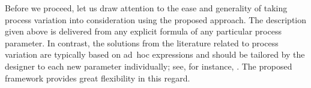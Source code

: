 Before we proceed, let us draw attention to the ease and generality of taking
process variation into consideration using the proposed approach. The
description given above is delivered from any explicit formula of any particular
process parameter. In contrast, the solutions from the literature related to
process variation are typically based on ad~hoc expressions and should be
tailored by the designer to each new parameter individually; see, for instance,
\cite{ghanta2006, bhardwaj2008, huang2009a}. The proposed framework provides
great flexibility in this regard.
